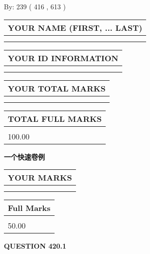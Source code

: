 \documentclass{ctexart}
\begin{document}
   
\hspace{1.0in} By: 
 239 ( 416 ,  613 )
   
   
   
   
\newpage 
\setcounter{page}{ 
   420001 } 
   
   
   
   
\noindent\begin{tabular}{|l|}
\hline
YOUR NAME (FIRST, ... LAST)  \\
\hline
 \\ 
 \\ 
\hline
\end{tabular}
\hspace{0.05in} \begin{tabular}{|l|}
\hline
 YOUR   ID   INFORMATION  \\
\hline
 \\ 
 \\ 
\hline
\end{tabular}
   
   
\vspace{0.2in}\noindent\begin{tabular}{|l|}
\hline
YOUR TOTAL MARKS  \\
\hline
 \\ 
 \\ 
\hline
\end{tabular}
\hspace{0.05in} \begin{tabular}{|l|}
\hline
TOTAL FULL MARKS  \\
\hline
 \\ 
100.00 \\
\hline
\end{tabular}
   
   
 \vspace{0.2in}
{\LARGE {\textbf{ 一个快速卷例}}}
   
   
  
\vspace{0.2in}
  
\noindent\begin{tabular}{|l|}
\hline
 YOUR MARKS  \\
\hline
 \\ 
 \\ 
\hline
\end{tabular}
\hspace{0.05in} \begin{tabular}{|l|}
\hline
 Full Marks  \\
\hline
 \\ 
50.00 \\
\hline
\end{tabular}
{\textbf{\Large{QUESTION
420.1 
}}}
  
\end{document}
